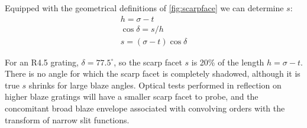Equipped with the geometrical definitions of \ref{fig:scarpface} we can determine $s$:
 \begin{eqnarray}
h=\sigma-t \nonumber \\
\cos{\delta}=s/h \nonumber \\
s=(\sigma-t)\cos{\delta}
 \end{eqnarray}

For an R4.5 grating, $\delta=77.5^\circ$, so the scarp facet $s$ is 20\% of the length $h=\sigma-t$.  There is no angle for which the scarp facet is completely shadowed, although it is true $s$ shrinks for large blaze angles.  Optical tests performed in reflection on higher blaze gratings will have a smaller scarp facet to probe, and the concomitant broad blaze envelope associated with convolving orders with the transform of narrow slit functions.  



